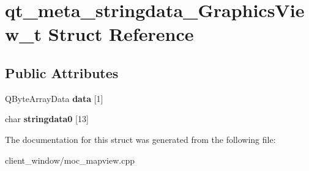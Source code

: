 \hypertarget{structqt__meta__stringdata__GraphicsView__t}{}\section{qt\+\_\+meta\+\_\+stringdata\+\_\+\+Graphics\+View\+\_\+t Struct Reference}
\label{structqt__meta__stringdata__GraphicsView__t}
\subsection*{Public Attributes}
\begin{DoxyCompactItemize}
\item 
Q\+Byte\+Array\+Data {\bfseries data} \mbox{[}1\mbox{]}\hypertarget{structqt__meta__stringdata__GraphicsView__t_ac86f6e7a1d889385cfc5775e99d15323}{}\label{structqt__meta__stringdata__GraphicsView__t_ac86f6e7a1d889385cfc5775e99d15323}

\item 
char {\bfseries stringdata0} \mbox{[}13\mbox{]}\hypertarget{structqt__meta__stringdata__GraphicsView__t_ab33450ec646d149ab143ecd58a19c38b}{}\label{structqt__meta__stringdata__GraphicsView__t_ab33450ec646d149ab143ecd58a19c38b}

\end{DoxyCompactItemize}


The documentation for this struct was generated from the following file\+:\begin{DoxyCompactItemize}
\item 
client\+\_\+window/moc\+\_\+mapview.\+cpp\end{DoxyCompactItemize}
